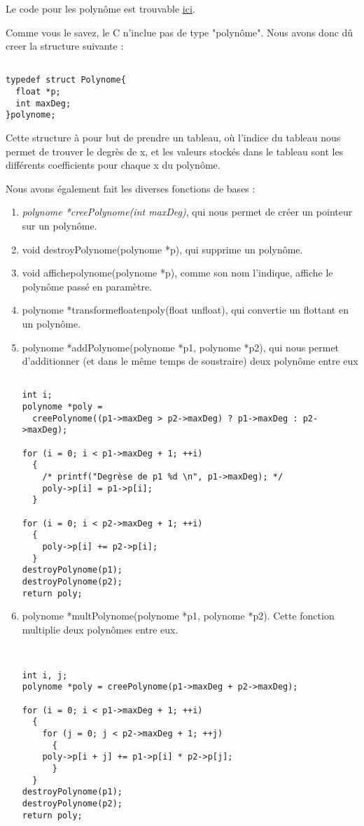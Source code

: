 \documentclass[letter]{article}
\begin{document}
Le code pour les polynôme est trouvable \href{polynome.c}{ici}. 

Comme vous le savez, le C n'inclue pas de type "polynôme". Nous avons donc dû creer la structure suivante :

\begin{verbatim}

typedef struct Polynome{
  float *p;
  int maxDeg;
}polynome;

\end{verbatim}

Cette structure à pour but de prendre un tableau, où l'indice du tableau nous permet de trouver le degrès de x, et les valeurs stockés dans le tableau sont les différents coefficients pour chaque x du polynôme.

Nous avons également fait les diverses fonctions de bases :
\begin{enumerate}
\item \emph{polynome *creePolynome(int maxDeg)}, qui nous permet de créer un pointeur sur un polynôme.
\item void destroyPolynome(polynome *p), qui supprime un polynôme.
\item void affichepolynome(polynome *p), comme son nom l'indique, affiche le polynôme passé en paramètre.
\item polynome *transformefloatenpoly(float unfloat), qui convertie un flottant en un polynôme.
\item polynome *addPolynome(polynome *p1, polynome *p2), qui nous permet d'additionner (et dans le même temps de soustraire) deux polynôme entre eux

\begin{verbatim}

int i;
polynome *poly =
  creePolynome((p1->maxDeg > p2->maxDeg) ? p1->maxDeg : p2->maxDeg);

for (i = 0; i < p1->maxDeg + 1; ++i)
  {
    /* printf("Degrèse de p1 %d \n", p1->maxDeg); */
    poly->p[i] = p1->p[i];
  }

for (i = 0; i < p2->maxDeg + 1; ++i)
  {
    poly->p[i] += p2->p[i];
  }
destroyPolynome(p1);
destroyPolynome(p2);
return poly;

\end{verbatim}
\item polynome *multPolynome(polynome *p1, polynome *p2). Cette fonction multiplie deux polynômes entre eux.

\begin{verbatim}


int i, j;
polynome *poly = creePolynome(p1->maxDeg + p2->maxDeg);

for (i = 0; i < p1->maxDeg + 1; ++i)
  {
    for (j = 0; j < p2->maxDeg + 1; ++j)
      {
	poly->p[i + j] += p1->p[i] * p2->p[j];
      }
  }
destroyPolynome(p1);
destroyPolynome(p2);
return poly;

\end{verbatim}
\end{enumerate}
\end{document}
